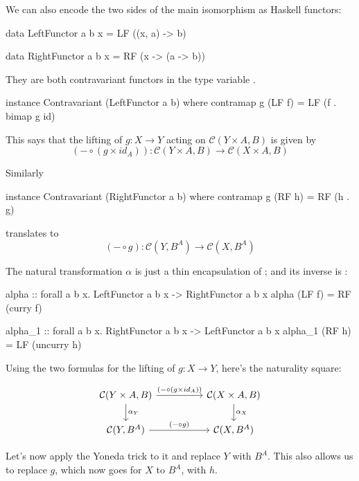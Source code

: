 \documentclass[DaoFP]{subfiles}
\begin{document}
We can also encode the two sides of the main isomorphism as Haskell functors:
\begin{haskell}
data LeftFunctor  a b x = LF ((x, a) -> b)
\end{haskell}
\begin{haskell}
data RightFunctor a b x = RF (x -> (a -> b))
\end{haskell}
They are both contravariant functors in the type variable .
\begin{haskell}
instance Contravariant (LeftFunctor a b) where
  contramap g (LF f) = LF (f . bimap g id)
\end{haskell}
This says that the lifting of $g \colon X \to Y$ acting on $ \mathcal{C}(Y \times A, B)$ is given by
\[ (- \circ (g \times id_A)) \colon\mathcal{C}(Y \times A, B) \to  \mathcal{C}(X \times A, B)\]

Similarly
\begin{haskell}
instance Contravariant (RightFunctor a b) where
  contramap g (RF h) = RF (h . g)
\end{haskell}
translates to 
\[ (- \circ g) \colon  \mathcal{C}(Y, B^A) \to \mathcal{C}(X, B^A) \]

The natural transformation $\alpha$ is just a thin encapsulation of ; and its inverse is :

\begin{haskell}
alpha :: forall a b x. LeftFunctor a b x -> RightFunctor a b x
alpha (LF f) = RF (curry f)
\end{haskell}

\begin{haskell}
alpha_1 :: forall a b x. RightFunctor a b x -> LeftFunctor a b x
alpha_1 (RF h) = LF (uncurry h)
\end{haskell}

Using the two formulas for the lifting of $g \colon X \to Y$, here's the naturality square:

\[
 \begin{tikzcd}
 \mathcal{C}(Y \times A, B)
 \arrow[rr, "(- \circ (g \times id_A))"]
 \arrow[d,  "\alpha_Y"]
& &
\mathcal{C}(X \times A, B)
  \arrow[d, "\alpha_X"]
 \\
 \mathcal{C}(Y, B^A)
 \arrow[rr, "(- \circ g)"]
& &
\mathcal{C}(X, B^A)
 \end{tikzcd}
\]

Let's now apply the Yoneda trick to it and replace $Y$ with $B^A$. This also allows us to replace $g$, which now goes for $X$ to $B^A$, with $h$. 
\end{document}
